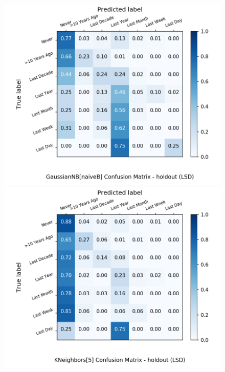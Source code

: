 \begin{figure}[H]
\begin{minipage}[b]{0.32\textwidth}
		\includegraphics[width=1.1\textwidth]{Plots/LSD_GaussianNB_naiveB_balance_False_holdout.png}
	\end{minipage}
	\begin{minipage}[b]{0.32\textwidth}
		\includegraphics[width=1.1\textwidth]{Plots/LSD_KNeighbors_5_balance_False_holdout.png}
  \end{minipage}
	\begin{minipage}[b]{0.32\textwidth}

\end{minipage}
\end{figure}
